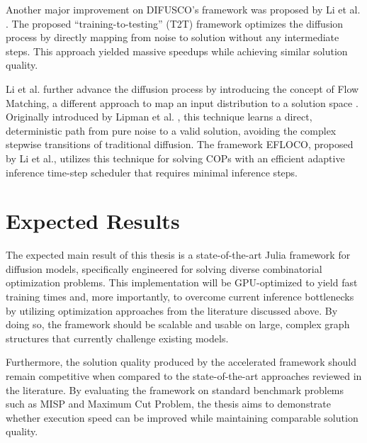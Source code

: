 \documentclass[11pt,a4paper]{article}
\begin{document}
Another major improvement on DIFUSCO's framework was proposed by Li et al. \cite{li-24-fastt2t}. The proposed ``training-to-testing'' (T2T) framework optimizes the diffusion process by directly mapping from noise to solution without any intermediate steps. This approach yielded massive speedups while achieving similar solution quality.

Li et al. further advance the diffusion process by introducing the concept of Flow Matching, a different approach to map an input distribution to a solution space \cite{li-26-efloco}. Originally introduced by Lipman et al. \cite{lipman-22-flow-matching}, this technique learns a direct, deterministic path from pure noise to a valid solution, avoiding the complex stepwise transitions of traditional diffusion. The framework EFLOCO, proposed by Li et al., utilizes this technique for solving COPs with an efficient adaptive inference time-step scheduler that requires minimal inference steps.

\section{Expected Results}
The expected main result of this thesis is a state-of-the-art Julia framework for diffusion models, specifically engineered for solving diverse combinatorial optimization problems. This implementation will be GPU-optimized to yield fast training times and, more importantly, to overcome current inference bottlenecks by utilizing optimization approaches from the literature discussed above. By doing so, the framework should be scalable and usable on large, complex graph structures that currently challenge existing models.

Furthermore, the solution quality produced by the accelerated framework should remain competitive when compared to the state-of-the-art approaches reviewed in the literature. By evaluating the framework on standard benchmark problems such as MISP and Maximum Cut Problem, the thesis aims to demonstrate whether execution speed can be improved while maintaining comparable solution quality.
\end{document}
